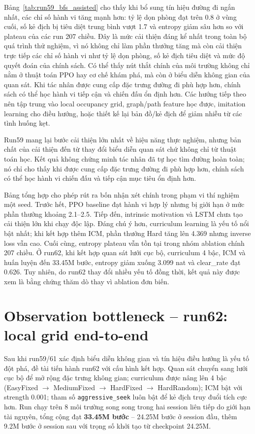 Bảng~\ref{tab:run59_bfs_assisted} cho thấy khi bổ sung tín hiệu đường đi ngắn nhất, các chỉ số hành vi tăng mạnh hơn: tỷ lệ dọn phòng đạt trên 0.8 ở vùng cuối, số kẻ địch bị tiêu diệt trung bình vượt 1.7 và entropy giảm sâu hơn so với plateau của các run 207 chiều. Đây là mức cải thiện đáng kể nhất trong toàn bộ quá trình thử nghiệm, vì nó không chỉ làm phần thưởng tăng mà còn cải thiện trực tiếp các chỉ số hành vi như tỷ lệ dọn phòng, số kẻ địch tiêu diệt và mức độ quyết đoán của chính sách. Có thể thấy nút thắt chính của môi trường không chỉ nằm ở thuật toán PPO hay cơ chế khám phá, mà còn ở biểu diễn không gian của quan sát. Khi tác nhân được cung cấp đặc trưng đường đi phù hợp hơn, chính sách có thể học hành vi tiếp cận và chiến đấu ổn định hơn. Các hướng tiếp theo nên tập trung vào local occupancy grid, graph/path feature học được, imitation learning cho điều hướng, hoặc thiết kế lại bản đồ/kẻ địch để giảm nhiễu từ các tình huống kẹt.

Run59 mang lại bước cải thiện lớn nhất về hiệu năng thực nghiệm, nhưng bản chất của cải thiện đến từ thay đổi biểu diễn quan sát chứ không chỉ từ thuật toán học. Kết quả không chứng minh tác nhân đã tự học tìm đường hoàn toàn; nó chỉ cho thấy khi được cung cấp đặc trưng đường đi phù hợp hơn, chính sách có thể học hành vi chiến đấu và tiếp cận mục tiêu ổn định hơn.

Bảng tổng hợp cho phép rút ra bốn nhận xét chính trong phạm vi thí nghiệm một seed. Trước hết, PPO baseline đạt hành vi hợp lý nhưng bị giới hạn ở mức phần thưởng khoảng 2.1--2.5. Tiếp đến, intrinsic motivation và LSTM chưa tạo cải thiện lớn khi chạy độc lập. Đáng chú ý hơn, curriculum learning là yếu tố nổi bật nhất; khi kết hợp thêm ICM, phần thưởng Hard tăng lên 4.369 nhưng inverse loss vẫn cao. Cuối cùng, entropy plateau vẫn tồn tại trong nhóm ablation chính 207 chiều. Ở run62, khi kết hợp quan sát lưới cục bộ, curriculum 4 bậc, ICM và huấn luyện đến 33.45M bước, entropy giảm xuống 3.099 nat và clear\_rate đạt 0.626. Tuy nhiên, do run62 thay đổi nhiều yếu tố đồng thời, kết quả này được xem là bằng chứng thăm dò thay vì ablation đơn biến.

\section{Observation bottleneck -- run62: local grid end-to-end}

Sau khi run59/61 xác định biểu diễn không gian và tín hiệu điều hướng là yếu tố đột phá, đề tài tiến hành run62 với cấu hình kết hợp. Quan sát chuyển sang lưới cục bộ để mở rộng đặc trưng không gian; curriculum được nâng lên 4 bậc (EasyFixed $\rightarrow$ MediumFixed $\rightarrow$ HardFixed $\rightarrow$ HardRandom); ICM bật với strength 0.001; tham số \texttt{aggressive\_seek} luôn bật để kẻ địch truy đuổi tích cực hơn. Run chạy trên 8 môi trường song song trong hai session liên tiếp do giới hạn tài nguyên, tổng cộng đạt \textbf{33.45M bước} -- 24.25M bước ở session đầu, thêm 9.2M bước ở session sau với trọng số khởi tạo từ checkpoint 24.25M.

